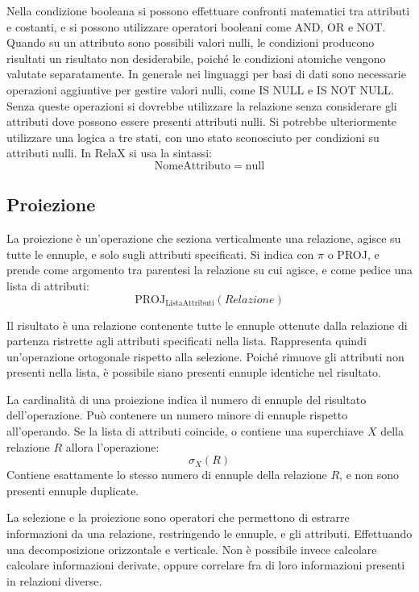 \documentclass{article}
\numberwithin{equation}{subsection}
\begin{document}
Nella condizione booleana si possono effettuare confronti matematici tra attributi e costanti, e si possono utilizzare operatori booleani come AND, OR e NOT. 
Quando su un attributo sono possibili valori nulli, le condizioni producono risultati un risultato non desiderabile, poiché le condizioni atomiche vengono valutate separatamente. In generale nei linguaggi per basi 
di dati sono necessarie operazioni aggiuntive per gestire valori nulli, come IS NULL e IS NOT NULL. Senza queste operazioni si dovrebbe utilizzare la relazione senza considerare gli attributi dove possono essere 
presenti attributi nulli. 
Si potrebbe ulteriormente utilizzare una logica a tre stati, con uno stato sconosciuto per condizioni su attributi nulli. In RelaX si usa la sintassi:
\begin{equation}
    \mathrm{NomeAttributo}=\mathrm{null}
\end{equation}

\subsection{Proiezione}

La proiezione è un'operazione che seziona verticalmente una relazione, agisce su tutte le ennuple, e solo sugli attributi specificati. Si indica con $\pi$ o PROJ, e prende come argomento tra parentesi la relazione 
su cui agisce, e come pedice una lista di attributi:
\begin{equation}
    \mathrm{PROJ}_{\mathrm{ListaAttributi}}(Relazione)
\end{equation}

Il risultato è una relazione contenente tutte le ennuple ottenute dalla relazione di partenza ristrette agli attributi specificati nella lista. Rappresenta quindi un'operazione ortogonale rispetto 
alla selezione. Poiché rimuove gli attributi non presenti nella lista, è possibile siano presenti ennuple identiche nel risultato. 

La cardinalità di una proiezione indica il numero di ennuple del risultato dell'operazione. Può contenere un numero minore di ennuple rispetto all'operando. Se la lista di attributi coincide, o contiene una 
superchiave $X$ della relazione $R$ allora l'operazione:
\begin{equation*}
    \sigma_X(R)
\end{equation*}
Contiene esattamente lo stesso numero di ennuple della relazione $R$, e non sono presenti ennuple duplicate. 


La selezione e la proiezione sono operatori che permettono di estrarre informazioni da una relazione, restringendo le ennuple, e gli attributi. Effettuando una decomposizione orizzontale e verticale. 
Non è possibile invece calcolare calcolare informazioni derivate, oppure correlare fra di loro informazioni presenti in relazioni diverse. 
\end{document}
